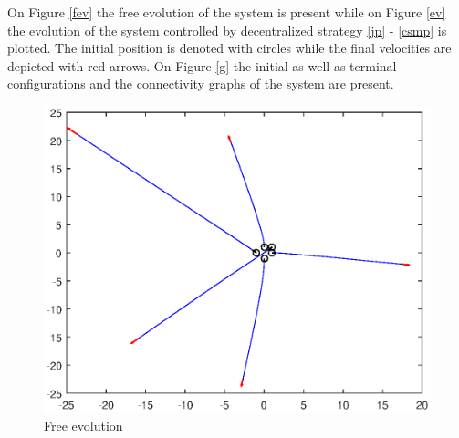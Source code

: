 \documentclass[a4paper, english]{article}
\begin{document}
On Figure \ref{fev} the free evolution of the system is present while 
on Figure \ref{ev} the evolution of the system  controlled by decentralized strategy \eqref{jp} - \eqref{csmp} is plotted. The initial position
is denoted with circles while the final velocities are depicted with red arrows. On Figure \ref{g} the initial as well as terminal configurations and the connectivity graphs of the system are present.
 \begin{figure}[ht]
 \centering
 \includegraphics[scale=0.5]{figures/a5_D_fev.eps}
 \caption{Free evolution}
 \label{fevf}
 \end{figure}
\end{document}
